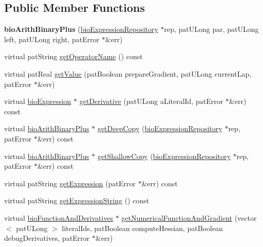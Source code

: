 \subsection*{Public Member Functions}
\begin{DoxyCompactItemize}
\item 
\mbox{\label{classbio_arith_binary_plus_a4b93682b80f1fa98f88679e1cbd6684b}} 
{\bfseries bio\+Arith\+Binary\+Plus} (\hyperlink{classbio_expression_repository}{bio\+Expression\+Repository} $\ast$rep, pat\+U\+Long par, pat\+U\+Long left, pat\+U\+Long right, pat\+Error $\ast$\&err)
\item 
virtual pat\+String \hyperlink{classbio_arith_binary_plus_a1d9032fda00f9f0d00f3244714c35cdb}{get\+Operator\+Name} () const
\item 
virtual pat\+Real \hyperlink{classbio_arith_binary_plus_a40a7b6945cd9118f110e580ab90c7b5f}{get\+Value} (pat\+Boolean prepare\+Gradient, pat\+U\+Long current\+Lap, pat\+Error $\ast$\&err)
\item 
virtual \hyperlink{classbio_expression}{bio\+Expression} $\ast$ \hyperlink{classbio_arith_binary_plus_a790383068d3be59378a18206199fb3f1}{get\+Derivative} (pat\+U\+Long a\+Literal\+Id, pat\+Error $\ast$\&err) const
\item 
virtual \hyperlink{classbio_arith_binary_plus}{bio\+Arith\+Binary\+Plus} $\ast$ \hyperlink{classbio_arith_binary_plus_a5ec101b24a6b02bb3fb19803749b3e83}{get\+Deep\+Copy} (\hyperlink{classbio_expression_repository}{bio\+Expression\+Repository} $\ast$rep, pat\+Error $\ast$\&err) const
\item 
virtual \hyperlink{classbio_arith_binary_plus}{bio\+Arith\+Binary\+Plus} $\ast$ \hyperlink{classbio_arith_binary_plus_a4e2587ad009e65821632b18d0253ff4c}{get\+Shallow\+Copy} (\hyperlink{classbio_expression_repository}{bio\+Expression\+Repository} $\ast$rep, pat\+Error $\ast$\&err) const
\item 
virtual pat\+String \hyperlink{classbio_arith_binary_plus_afb38f58cc62bf6fbce4383ce40b1aecf}{get\+Expression} (pat\+Error $\ast$\&err) const
\item 
virtual pat\+String \hyperlink{classbio_arith_binary_plus_af062d1a1394e9fedf99e23911110f384}{get\+Expression\+String} () const
\item 
virtual \hyperlink{classbio_function_and_derivatives}{bio\+Function\+And\+Derivatives} $\ast$ \hyperlink{classbio_arith_binary_plus_a17d6b61d7dd58d5c03c087ddc7054632}{get\+Numerical\+Function\+And\+Gradient} (vector$<$ pat\+U\+Long $>$ literal\+Ids, pat\+Boolean compute\+Hessian, pat\+Boolean debug\+Derivatives, pat\+Error $\ast$\&err)
\end{DoxyCompactItemize}
